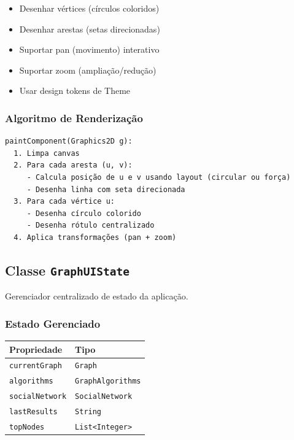 \documentclass[12pt,a4paper]{article}
\begin{document}
\begin{itemize}
    \item Desenhar vértices (círculos coloridos)
    \item Desenhar arestas (setas direcionadas)
    \item Suportar pan (movimento) interativo
    \item Suportar zoom (ampliação/redução)
    \item Usar design tokens de Theme
\end{itemize}

\subsubsection{Algoritmo de Renderização}

\begin{verbatim}
paintComponent(Graphics2D g):
  1. Limpa canvas
  2. Para cada aresta (u, v):
     - Calcula posição de u e v usando layout (circular ou força)
     - Desenha linha com seta direcionada
  3. Para cada vértice u:
     - Desenha círculo colorido
     - Desenha rótulo centralizado
  4. Aplica transformações (pan + zoom)
\end{verbatim}

\subsection{Classe \texttt{GraphUIState}}

Gerenciador centralizado de estado da aplicação.

\subsubsection{Estado Gerenciado}

\begin{table}[h]
\centering
\begin{tabular}{|l|l|}
\hline
\textbf{Propriedade} & \textbf{Tipo} \\
\hline
\texttt{currentGraph} & \texttt{Graph} \\
\hline
\texttt{algorithms} & \texttt{GraphAlgorithms} \\
\hline
\texttt{socialNetwork} & \texttt{SocialNetwork} \\
\hline
\texttt{lastResults} & \texttt{String} \\
\hline
\texttt{topNodes} & \texttt{List<Integer>} \\
\hline
\end{tabular}
\end{table}
\end{document}
